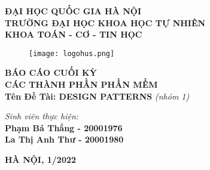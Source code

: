 \documentclass{article}
\begin{document}

	\begin{center}
		\fontsize{14}{20}\selectfont
		\textbf{ĐẠI HỌC QUỐC GIA HÀ NỘI\\
			\textbf{TRƯỜNG ĐẠI HỌC KHOA HỌC TỰ NHIÊN\\}
			\textbf{KHOA TOÁN - CƠ - TIN HỌC}}
		\vspace{0.8cm}
		\begin{figure}[htp]
			\begin{center}
				\texttt{[image: logohus.png]}
			\end{center}
		\end{figure}
		\fontsize{16}{20}\selectfont\textbf{BÁO CÁO CUỐI KỲ\\}
		\fontsize{20}{20}\selectfont\textbf{CÁC THÀNH PHẦN PHẦN MỀM\\}
	\vspace{1cm}
	    \fontsize{18}{18}\selectfont\textbf{Tên Đề Tài: DESIGN PATTERNS}
\textit{(nhóm 1)\\}
	    \vspace{1cm}
	 \end{center}

    \begin{flushleft}
		\fontsize{16}{20}\selectfont
		\textit{Sinh viên thực hiện:}\\
		\textbf{Phạm Bá Thắng - 20001976}\\
		\textbf{La Thị Anh Thư - 20001980}\\
    \end{flushleft}
	\vspace{3cm}
    \begin{center}
		\fontsize{14}{20}\selectfont
		\textbf{HÀ NỘI, 1/2022}
	\end{center}
	\pagebreak
\end{document}
